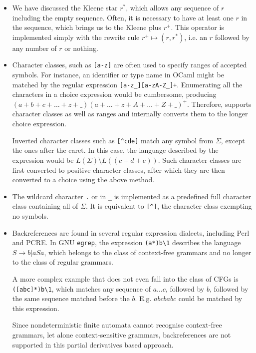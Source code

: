 \begin{itemize}

   \item We have discussed the Kleene star $r^*$, which allows any sequence of
      $r$ including the empty sequence. Often, it is necessary to have at least
      one $r$ in the sequence, which brings us to the Kleene plus $r^+$. This
      operator is implemented simply with the rewrite rule $r^+ \mapsto (r,
      r^*)$, i.e. an $r$ followed by any number of $r$ or nothing.

   \item Character classes, such as \verb'[a-z]' are often used to specify
      ranges of accepted symbols. For instance, an identifier or type name in
      OCaml might be matched by the regular expression \verb'[a-z_][a-zA-Z_]+'.
      Enumerating all the characters in a choice expression would be cumbersome,
      producing $(a+b+c+\dots+z+\_)(a+\dots+z+A+\dots+Z+\_)^+$. Therefore,
      \dreml supports character classes as well as ranges and internally
      converts them to the longer choice expression.
      
      Inverted character classes such as \verb'[^cde]' match any symbol from
      $\Sigma$, except the ones after the caret. In this case, the language
      described by the expression would be $L(\Sigma) \setminus L((c+d+e))$.
      Such character classes are first converted to positive character classes,
      after which they are then converted to a choice using the above method.

   \item The wildcard character \verb'.' or in \ocamllex \verb'_' is implemented
      as a predefined full character class containing all of $\Sigma$. It is
      equivalent to \verb'[^]', the character class exempting no symbols.

   \item Backreferences are found in several regular expression dialects,
      including Perl and PCRE. In GNU \texttt{egrep}, the expression
      \verb'(a*)b\1' describes the language $S \to b | a S a$, which belongs to
      the class of context-free grammars and no longer to the class of regular
      grammars.

      A more complex example that does not even fall into the class of CFGs is
      \verb'([abc]*)b\1', which matches any sequence of $a \dots c$, followed by
      $b$, followed by the same sequence matched before the $b$. E.g. $abcbabc$
      could be matched by this expression.

      Since nondeterministic finite automata cannot recognise context-free
      grammars, let alone context-sensitive grammars, backreferences are not
      supported in this partial derivatives based approach.
      
\end{itemize}


